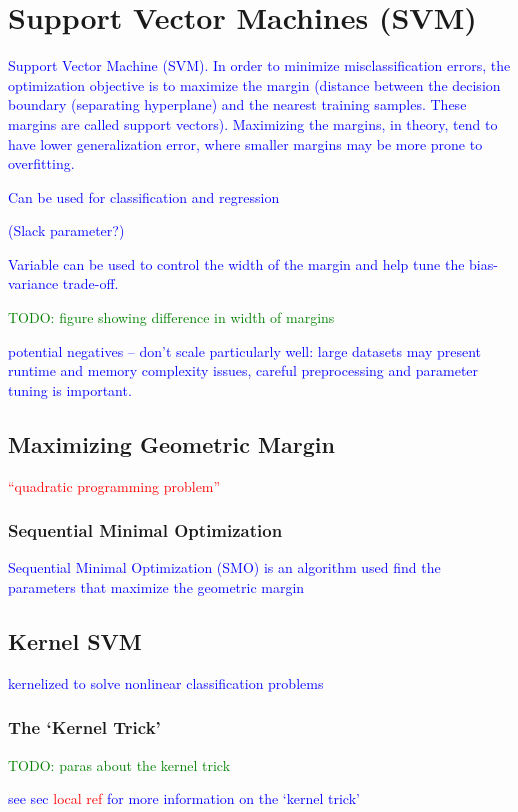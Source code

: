 \section{Support Vector Machines (SVM)}

\textcolor{blue}{Support Vector Machine (SVM). In order to minimize misclassification errors, the optimization objective is to maximize the margin (distance between the decision boundary (separating hyperplane) and the nearest training samples. These margins are called support vectors). Maximizing the margins, in theory, tend to have lower generalization error, where smaller margins may be more prone to overfitting.}

\textcolor{blue}{Can be used for classification and regression}

\textcolor{blue}{(Slack parameter?)}

\textcolor{blue}{Variable can be used to control the width of the margin and help tune the bias-variance trade-off.}

\textcolor{green}{TODO: figure showing difference in width of margins}

\textcolor{blue}{potential negatives -- don't scale particularly well: large datasets may present runtime and memory complexity issues, careful preprocessing and parameter tuning is important.}

\subsection{Maximizing Geometric Margin}

\textcolor{red}{``quadratic programming problem''}

\subsubsection{Sequential Minimal Optimization}

\textcolor{blue}{Sequential Minimal Optimization (SMO) is an algorithm used find the parameters that maximize the geometric margin}

\subsection{Kernel SVM}

\textcolor{blue}{kernelized to solve nonlinear classification problems}

\subsubsection{The `Kernel Trick'}

\textcolor{green}{TODO: paras about the kernel trick}

\textcolor{blue}{see sec \textcolor{red}{local ref} for more information on the `kernel trick'}

